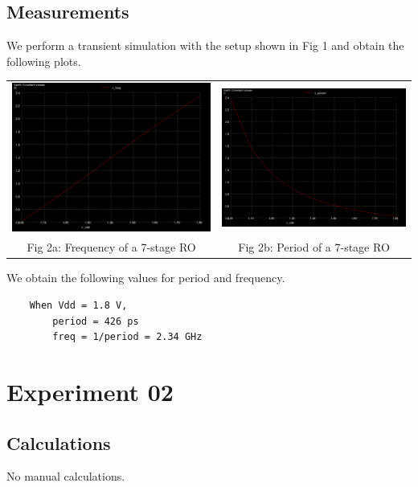 \documentclass[12pt,a4paper]{article}
\begin{document}
\subsection{Measurements}
\noindent We perform a transient simulation with the setup shown in Fig 1 and obtain the following plots.
\begin{center}
\begin{tabular}{cc}
     \includegraphics[width=0.47\linewidth]{tut4/reports/media/expt1_freq.png} &
     \includegraphics[width=0.47\linewidth]{tut4/reports/media/expt1_prd.png} \\
     Fig 2a: Frequency of a 7-stage RO & Fig 2b: Period of a 7-stage RO
\end{tabular}
\end{center}
\noindent We obtain the following values for period and frequency.
\begin{verbatim}
    When Vdd = 1.8 V,
        period = 426 ps
        freq = 1/period = 2.34 GHz
\end{verbatim}

\section{Experiment 02}
\subsection{Calculations}
\noindent No manual calculations.
\end{document}
